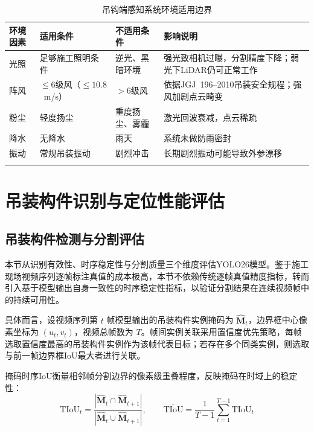 \begin{table}[htbp]
  \centering
  \caption{吊钩端感知系统环境适用边界}
  \label{tab:environment_boundary}
  \begin{tabular*}{\textwidth}{@{\extracolsep{\fill}}>{\centering\arraybackslash}m{1.5cm}>{\centering\arraybackslash}m{3.2cm}>{\centering\arraybackslash}m{2.8cm}>{\centering\arraybackslash}m{5.5cm}}
    \Xhline{1pt}
    \textbf{环境因素} & \textbf{适用条件} & \textbf{不适用条件} & \textbf{影响说明} \\
    \hline
    光照 & 足够施工照明条件 & 逆光、黑暗环境 & 强光致相机过曝，分割精度下降；弱光下LiDAR仍可正常工作 \\
    阵风 & $\le 6$级风（$\le 10.8$~m/s） & $> 6$级风 & 依据JGJ~196--2010吊装安全规程；强风加剧点云畸变 \\
    粉尘 & 轻度扬尘 & 重度扬尘、雾霾 & 激光回波衰减，点云稀疏 \\
    降水 & 无降水 & 雨天 & 系统未做防雨密封 \\
    振动 & 常规吊装振动 & 剧烈冲击 & 长期剧烈振动可能导致外参漂移 \\
    \Xhline{1pt}
  \end{tabular*}
\end{table}

\section{吊装构件识别与定位性能评估}\label{sec_ch6_recognition_localization}

\subsection{吊装构件检测与分割评估}\label{subsec_ch6_yolo26_eval}

本节从识别有效性、时序稳定性与分割质量三个维度评估YOLO26模型。鉴于施工现场视频序列逐帧标注真值的成本极高，本节不依赖传统逐帧真值精度指标，转而引入基于模型输出自身一致性的时序稳定性指标，以验证分割结果在连续视频帧中的持续可用性。

具体而言，设视频序列第 $t$ 帧模型输出的吊装构件实例掩码为 $\hat{\mathbf{M}}_t$，边界框中心像素坐标为 $(u_t,v_t)$，视频总帧数为 $T$。帧间实例关联采用置信度优先策略，每帧选取置信度最高的吊装构件实例作为该帧代表目标；若存在多个同类实例，则选取与前一帧边界框IoU最大者进行关联。

掩码时序IoU衡量相邻帧分割边界的像素级重叠程度，反映掩码在时域上的稳定性：
\begin{equation}
\mathrm{TIoU}_t=\frac{|\hat{\mathbf{M}}_t\cap\hat{\mathbf{M}}_{t+1}|}{|\hat{\mathbf{M}}_t\cup\hat{\mathbf{M}}_{t+1}|},
\qquad
\overline{\mathrm{TIoU}}=\frac{1}{T-1}\sum_{t=1}^{T-1}\mathrm{TIoU}_t
\end{equation}

